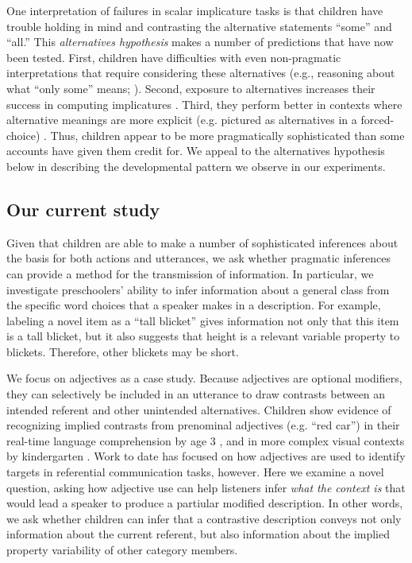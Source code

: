 \documentclass[man]{apa2}
\begin{document}
One interpretation of failures in scalar implicature tasks is that children have trouble holding in mind and contrasting the alternative statements ``some'' and ``all.'' This \emph{alternatives hypothesis} makes a number of predictions that have now been tested. First, children have difficulties with even non-pragmatic interpretations that require considering these alternatives (e.g., reasoning about what ``only some'' means; ). Second, exposure to alternatives increases their success in computing implicatures \cite{skordos2014}. Third, they perform better in contexts where alternative meanings are more explicit (e.g. pictured as alternatives in a forced-choice) \cite{miller2005,stiller2014}. Thus, children appear to be more pragmatically sophisticated than some accounts have given them credit for. We appeal to the alternatives hypothesis below in describing the developmental pattern we observe in our experiments. 

\subsection{Our current study}

Given that children are able to make a number of sophisticated inferences about the basis for both actions and utterances, we ask whether pragmatic inferences can provide a method for the transmission of information. In particular, we investigate preschoolers' ability to infer information about a general class from the specific word choices that a speaker makes in a description. For example, labeling a novel item as a ``tall blicket'' gives information not only that this item is a tall blicket, but it also suggests that height is a relevant variable property to blickets. Therefore, other blickets may be short. 

We focus on adjectives as a case study.  Because adjectives are optional modifiers, they can selectively be included in an utterance to draw contrasts between an intended referent and other unintended alternatives. 
Children show evidence of recognizing implied contrasts from prenominal adjectives (e.g. ``red car'') in their real-time language comprehension by age 3 \cite{fernald2010}, and in more complex visual contexts by kindergarten \cite{nadig2002}. Work to date has focused on how adjectives are used to identify targets in referential communication tasks, however.  Here we examine a novel question, asking how adjective use can help listeners infer \emph{what the context is} that would lead a speaker to produce a partiular modified description.  In other words, we ask whether children can infer that a contrastive description conveys not only information about the current referent, but also information about the implied property variability of other category members.
\end{document}
